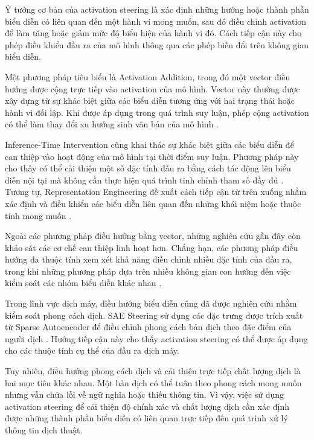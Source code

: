 Ý tưởng cơ bản của activation steering là xác định những hướng hoặc thành phần biểu diễn có liên quan đến một hành vi mong muốn, sau đó điều chỉnh activation để làm tăng hoặc giảm mức độ biểu hiện của hành vi đó. Cách tiếp cận này cho phép điều khiển đầu ra của mô hình thông qua các phép biến đổi trên không gian biểu diễn.

Một phương pháp tiêu biểu là Activation Addition, trong đó một vector điều hướng được cộng trực tiếp vào activation của mô hình. Vector này thường được xây dựng từ sự khác biệt giữa các biểu diễn tương ứng với hai trạng thái hoặc hành vi đối lập. Khi được áp dụng trong quá trình suy luận, phép cộng activation có thể làm thay đổi xu hướng sinh văn bản của mô hình \cite{rimsky-etal-2024-steering}.

Inference-Time Intervention cũng khai thác sự khác biệt giữa các biểu diễn để can thiệp vào hoạt động của mô hình tại thời điểm suy luận. Phương pháp này cho thấy có thể cải thiện một số đặc tính đầu ra bằng cách tác động lên biểu diễn nội tại mà không cần thực hiện quá trình tinh chỉnh tham số đầy đủ \cite{li2023inference}. Tương tự, Representation Engineering đề xuất cách tiếp cận từ trên xuống nhằm xác định và điều khiển các biểu diễn liên quan đến những khái niệm hoặc thuộc tính mong muốn \cite{zou2023representation}.

Ngoài các phương pháp điều hướng bằng vector, những nghiên cứu gần đây còn khảo sát các cơ chế can thiệp linh hoạt hơn. Chẳng hạn, các phương pháp điều hướng đa thuộc tính xem xét khả năng điều chỉnh nhiều đặc tính của đầu ra, trong khi những phương pháp dựa trên nhiều không gian con hướng đến việc kiểm soát các nhóm biểu diễn khác nhau \cite{nguyen2025multi,jiang2026msrs,Wang_2025}.

Trong lĩnh vực dịch máy, điều hướng biểu diễn cũng đã được nghiên cứu nhằm kiểm soát phong cách dịch. SAE Steering sử dụng các đặc trưng được trích xuất từ Sparse Autoencoder để điều chỉnh phong cách bản dịch theo đặc điểm của người dịch \cite{scalena2026steering}. Hướng tiếp cận này cho thấy activation steering có thể được áp dụng cho các thuộc tính cụ thể của đầu ra dịch máy.

Tuy nhiên, điều hướng phong cách dịch và cải thiện trực tiếp chất lượng dịch là hai mục tiêu khác nhau. Một bản dịch có thể tuân theo phong cách mong muốn nhưng vẫn chứa lỗi về ngữ nghĩa hoặc thiếu thông tin. Vì vậy, việc sử dụng activation steering để cải thiện độ chính xác và chất lượng dịch cần xác định được những thành phần biểu diễn có liên quan trực tiếp đến quá trình xử lý thông tin dịch thuật.

